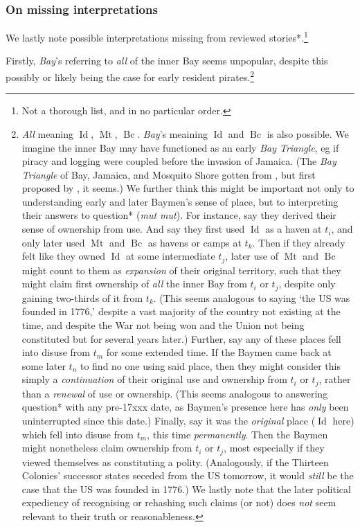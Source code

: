 \documentclass{amsart}
\newcommand{\ment}[1]{\textit{#1}} %
\newcommand{\forn}[1]{\textit{#1}} %
\DeclareMathOperator{\id}{Id} %
\DeclareMathOperator{\mt}{Mt} %
\DeclareMathOperator{\bc}{Bc} %
\theoremstyle{definition}
\theoremstyle{remark}
\begin{document}
		\subsubsection{On missing interpretations}
		\label{sss:onmissinginterpret}
		We lastly note possible interpretations missing from reviewed stories*.\footnote{Not a thorough list, and in no particular order.} 
		
		Firstly, \ment{Bay}'s referring to \emph{all} of the inner Bay seems unpopular, despite this possibly or likely being the case for early resident pirates.\footnote{\ment{All} meaning \(\id\), \(\mt\), \(\bc\). \ment{Bay}'s meaining \(\id\) and \(\bc\) is also possible. We imagine the inner Bay may have functioned as an early \ment{Bay Triangle}, eg if piracy and logging were coupled before the invasion of Jamaica. (The \ment{Bay Triangle} of Bay, Jamaica, and Mosquito Shore gotten from , but first proposed by \cite{nay89}, it seems.) We further think this might be important not only to understanding early and later Baymen's sense of place, but to interpreting their answers to question* (\forn{mut mut}). For instance, say they derived their sense of ownership from use. And say they first used \(\id\) as a haven at \(t_i\), and only later used \(\mt\) and \(\bc\) as havens or camps at \(t_k\). Then if they already felt like they owned \(\id\) at some intermediate \(t_j\), later use of \(\mt\) and \(\bc\) might count to them as \emph{expansion} of their original territory, such that they might claim first ownership of \emph{all} the inner Bay from \(t_i\) or \(t_j\), despite only gaining two-thirds of it from \(t_k\). (This seems analogous to saying `the US was founded in 1776,' despite a vast majority of the country not existing at the time, and despite the War not being won and the Union not being constituted but for several years later.) Further, say any of these places fell into disuse from \(t_m\) for some extended time. If the Baymen came back at some later \(t_n\) to find no one using said place, then they might consider this simply a \emph{continuation} of their original use and ownership from \(t_i\) or \(t_j\), rather than a \emph{renewal} of use or ownership. (This seems analogous to answering question* with any pre-17xxx date, as Baymen's presence here has \emph{only} been uninterrupted since this date.) Finally, say it was the \emph{original} place (\(\id\) here) which fell into disuse from \(t_m\), this time \emph{permanently}. Then the Baymen might nonetheless claim ownership from \(t_i\) or \(t_j\), most especially if they viewed themselves as constituting a polity. (Analogously, if the Thirteen Colonies' successor states seceded from the US tomorrow, it would \emph{still} be the case that the US was founded in 1776.) We lastly note that the later political expediency of recognising or rehashing such claims (or not) does \emph{not} seem relevant to their truth or reasonableness.}
		
\end{document}
